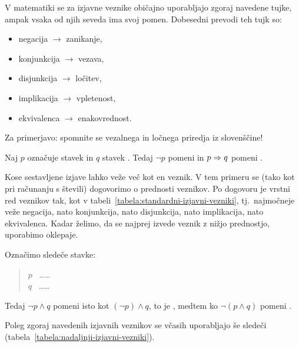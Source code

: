 \begin{opomba}
V matematiki se za izjavne veznike običajno uporabljajo zgoraj navedene tujke, ampak vsaka od njih seveda ima svoj pomen. Dobesedni prevodi teh tujk so:
\begin{itemize}
\item
negacija $\to$ zanikanje,
\item
konjunkcija $\to$ vezava,
\item
disjunkcija $\to$ ločitev,
\item
implikacija $\to$ vpletenost,
\item
ekvivalenca $\to$ enakovrednost.
\end{itemize}
Za primerjavo: spomnite se vezalnega in ločnega priredja iz slovenščine!
\end{opomba}

\begin{zgled}
Naj $p$ označuje stavek  in $q$ stavek . Tedaj $\lnot{p}$ pomeni  in $p \Rightarrow q$ pomeni .
\end{zgled}

Kose sestavljene izjave lahko veže več kot en veznik. V tem primeru se (tako kot pri računanju s števili) dogovorimo o prednosti veznikov. Po dogovoru je vrstni red veznikov tak, kot v tabeli~\ref{tabela:standardni-izjavni-vezniki}, tj.~najmočneje veže negacija, nato konjunkcija, nato disjunkcija, nato implikacija, nato ekvivalenca. Kadar želimo, da se najprej izvede veznik z nižjo prednostjo, uporabimo oklepaje.

\begin{zgled}
Označimo sledeče stavke:
\begin{quote}
$p$ \ \ldots\ldots\  \\
$q$ \ \ldots\ldots\ 
\end{quote}
Tedaj $\lnot{p} \land q$ pomeni isto kot $(\lnot{p}) \land q$, to je , medtem ko $\lnot(p \land q)$ pomeni .
\end{zgled}

Poleg zgoraj navedenih izjavnih veznikov se včasih uporabljajo še sledeči (tabela~\ref{tabela:nadaljnji-izjavni-vezniki}).

